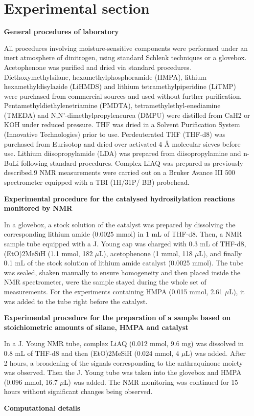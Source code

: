 \documentclass[journal=jacsat,manuscript=article]{achemso}
\begin{document}
	\section{Experimental section}
	{\bf General procedures of laboratory}
	
	All procedures involving moisture-sensitive components were	performed under an inert atmosphere of dinitrogen, using standard Schlenk techniques or a glovebox. Acetophenone was purified and dried via standard procedures.  Diethoxymethylsilane, hexamethylphosphoramide (HMPA), lithium hexamethyldisylazide (LiHMDS) and lithium tetramethylpiperidine (LiTMP) were purchased from commercial sources and used without further purification. Pentamethyldiethylenetriamine (PMDTA), tetramethylethyl-enediamine (TMEDA) and N,N'-dimethylpropyleneurea (DMPU) were distilled from CaH2 or KOH under reduced pressure. THF was dried in a Solvent Purification System (Innovative Technologies) prior to use. Perdeuterated THF (THF-d8) was purchased from Eurisotop and dried over activated 4 \si{\angstrom} molecular sieves before use. Lithium diisopropylamide (LDA) was prepared from diisopropylamine and n-BuLi
	following standard procedures. Complex LiAQ was prepared as previously described.9 NMR measurements were carried out on
	a Bruker Avance III 500 spectrometer equipped with a TBI (1H/31P/ BB) probehead.
	
	{\bf Experimental procedure for the catalysed hydrosilylation
	reactions monitored by NMR}

	In a glovebox, a stock solution of the catalyst was prepared by	dissolving the corresponding lithium amide (0.0025 mmol) in 1 mL of THF-d8. Then, a NMR sample tube equipped with a J. Young cap was charged with 0.3 mL of THF-d8, (EtO)2MeSiH
	(1.1 mmol, 182 $\mu$L), acetophenone (1 mmol, 118 $\mu$L), and	finally 0.1 mL of the stock solution of lithium amide catalyst (0.0025 mmol). The tube was sealed, shaken manually to	ensure homogeneity and then placed inside the NMR spectrometer, were the sample stayed during the whole set of measurements. For the experiments containing HMPA (0.015 mmol, 2.61 $\mu$L), it was added to the tube right before the catalyst.
	
	{\bf Experimental procedure for the preparation of a sample based on stoichiometric amounts of silane, HMPA and catalyst}
	
	In a J. Young NMR tube, complex LiAQ (0.012 mmol, 9.6 mg) was dissolved in 0.8 mL of THF-d8 and then (EtO)2MeSiH (0.024 mmol, 4 $\mu$L) was added. After 2 hours, a broadening of the signals corresponding to the anthraquinone moiety was
	observed. Then the J. Young tube was taken into the glovebox and HMPA (0.096 mmol, 16.7 $\mu$L) was added. The NMR monitoring
	was continued for 15 hours without significant changes being observed.
	
	{\bf Computational details}
	
\end{document}
